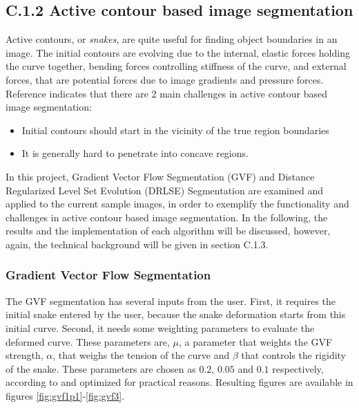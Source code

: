 \documentclass{article}
\begin{document}
\subsection*{C.1.2 Active contour based image segmentation}
Active contours, or \emph{snakes}, are quite useful for finding object boundaries in an image. The initial contours are evolving due to the internal, elastic forces holding the curve together, bending forces controlling stiffness of the curve, and external forces, that are potential forces due to image gradients and pressure forces. Reference \cite{gvf} indicates that there are 2 main challenges in active contour based image segmentation:
\begin{itemize}
\item Initial contours should start in the vicinity of the true region boundaries
\item It is generally hard to penetrate into concave regions.
\end{itemize}
In this project, Gradient Vector Flow Segmentation (GVF) \cite{gvf} and Distance Regularized Level Set Evolution (DRLSE) Segmentation \cite{drlse} are examined and applied to the current sample images, in order to exemplify the functionality and challenges in active contour based image segmentation. In the following, the results and the implementation of each algorithm will be discussed, however, again, the technical background will be given in section C.1.3. 


\subsubsection*{Gradient Vector Flow Segmentation}
The GVF segmentation has several inputs from the user. First, it requires the initial snake entered by the user, because the snake deformation starts from this initial curve. Second, it needs some weighting parameters to evaluate the deformed curve. These parameters are, $\mu$, a parameter that weights the GVF strength, $\alpha$, that weighs the tension of the curve and $\beta$ that controls the rigidity of the snake. These parameters are chosen as $0.2$, $0.05$ and $0.1$ respectively, according to \cite{gvf} and optimized for practical reasons. Resulting figures are available in figures \ref{fig:gvf1p1}-\ref{fig:gvf3}.
\end{document}
